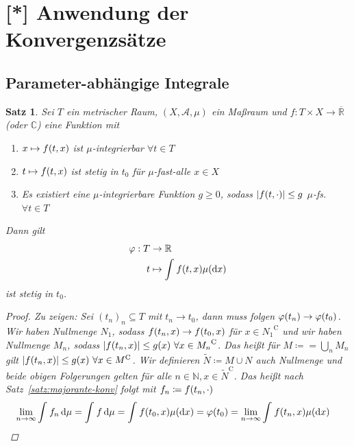 \documentclass[11pt, twoside, a4paper]{article}
\theoremstyle{plain}
\newtheorem{satz}[blockelement]{Satz}
\numberwithin{equation}{subsection}
\newcommand{\pair}[1]{\left(#1\right)}
\newcommand{\of}[1]{\mathopen{}\mathclose{}\bgroup\left(#1\aftergroup\egroup\right)}
\newcommand{\abs}[1]{\left\lvert#1\right\rvert}
\newcommand{\dif}{\mathop{}\!\mathrm{d}}
\newcommand{\toinf}{\to\infty}
\newcommand{\comp}[1]{{#1}^{\mathrm{C}}}
\newcommand{\R}{\mathbb{R}}
\newcommand{\N}{\mathbb{N}}
\newcommand{\C}{\mathbb{C}}
\newcommand{\mA}{\mathcal{A}}
\begin{document}
    \newpage


    \section{[*] Anwendung der Konvergenzsätze}

    \subsection{Parameter-abhängige Integrale}
    \thispagestyle{pagenumberonly}

    \begin{satz} %
        Sei $T$ ein metrischer Raum, $\pair{X, \mA, \mu}$ ein Maßraum und $f: T \times X \to\overline{\R}$ (oder $\C$) eine Funktion mit
        \begin{enumerate}[label=(\roman*)]
            \item $x\mapsto f\of{t, x}$ ist $\mu$-integrierbar $\forall t\in T$
            \item $t \mapsto f\of{t, x}$ ist stetig in $t_0$ für $\mu$-fast-alle $x\in X$
            \item Es existiert eine $\mu$-integrierbare Funktion $g\geq 0$, sodass $\abs{f\of{t, \cdot}}\leq g$ $\mu$-fs. $\forall t\in T$
        \end{enumerate}
        Dann gilt
        \begin{align*}
            \varphi: T &\to\R\\
            t &\mapsto \int_{}^{} f\of{t, x} \mu\of{\dif x}
        \end{align*}
        ist stetig in $t_0$.

        \begin{proof}
            Zu zeigen: Sei $(t_n)_n \subseteq T$ mit $t_n \to t_0$, dann muss folgen $\varphi\of{t_n} \to \varphi\of{t_0}$.\\
            Wir haben Nullmenge $N_1$, sodass $f\of{t_n, x}\to f\of{t_0, x}$ für $x\in\comp{N_1}$ und wir haben Nullmenge $M_n$, sodass $\abs{f\of{t_n, x}}\leq g\of{x}~\forall x\in\comp{M_n}$. Das heißt für $M \coloneqq = \bigcup_{n} M_n$ gilt $\abs{f\of{t_n, x}} \leq g\of{x}~\forall x \in\comp{M}$. Wir definieren $\tilde{N} \coloneqq M \cup N$ auch Nullmenge und beide obigen Folgerungen gelten für alle $n\in\N, x\in\comp{\tilde{N}}$. Das heißt nach Satz~\ref{satz:majorante-konv} folgt mit $f_n \coloneqq f\of{t_n, \cdot}$
            \begin{align*}
                \lim_{n\toinf} \int_{}^{} f_n \dif \mu &= \int_{}^{} f \dif \mu = \int_{}^{} f\of{t_0, x} \mu\of{\dif x} = \varphi\of{t_0} = \lim_{n\toinf} \int_{}^{} f\of{t_n, x} \mu\of{\dif x}\qedhere
            \end{align*}
        \end{proof}
    \end{satz}
\end{document}
